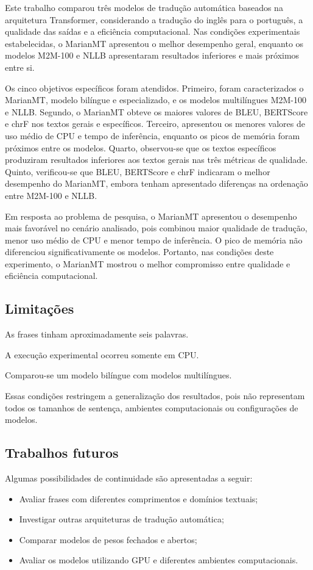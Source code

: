 Este trabalho comparou três modelos de tradução automática baseados na arquitetura Transformer, considerando a tradução do inglês para o português, a qualidade das saídas e a eficiência computacional. Nas condições experimentais estabelecidas, o MarianMT apresentou o melhor desempenho geral, enquanto os modelos M2M-100 e NLLB apresentaram resultados inferiores e mais próximos entre si.

Os cinco objetivos específicos foram atendidos. Primeiro, foram caracterizados o MarianMT, modelo bilíngue e especializado, e os modelos multilíngues M2M-100 e NLLB. Segundo, o MarianMT obteve os maiores valores de BLEU, BERTScore e chrF nos textos gerais e específicos. Terceiro, apresentou os menores valores de uso médio de CPU e tempo de inferência, enquanto os picos de memória foram próximos entre os modelos. Quarto, observou-se que os textos específicos produziram resultados inferiores aos textos gerais nas três métricas de qualidade. Quinto, verificou-se que BLEU, BERTScore e chrF indicaram o melhor desempenho do MarianMT, embora tenham apresentado diferenças na ordenação entre M2M-100 e NLLB.

Em resposta ao problema de pesquisa, o MarianMT apresentou o desempenho mais favorável no cenário analisado, pois combinou maior qualidade de tradução, menor uso médio de CPU e menor tempo de inferência. O pico de memória não diferenciou significativamente os modelos. Portanto, nas condições deste experimento, o MarianMT mostrou o melhor compromisso entre qualidade e eficiência computacional.

\subsection{Limitações}

As frases tinham aproximadamente seis palavras.

A execução experimental ocorreu somente em CPU.

Comparou-se um modelo bilíngue com modelos multilíngues.

Essas condições restringem a generalização dos resultados, pois não representam todos os tamanhos de sentença, ambientes computacionais ou configurações de modelos.

\subsection{Trabalhos futuros}

Algumas possibilidades de continuidade são apresentadas a seguir:

\begin{itemize}
\item Avaliar frases com diferentes comprimentos e domínios textuais;

\item Investigar outras arquiteturas de tradução automática;

\item Comparar modelos de pesos fechados e abertos;

\item Avaliar os modelos utilizando GPU e diferentes ambientes computacionais.
\end{itemize}
